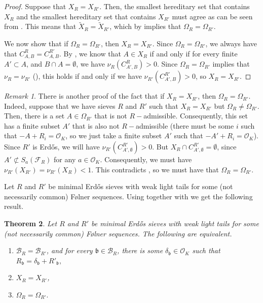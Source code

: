 \documentclass[a4paper,11pt,reqno]{amsart}
\theoremstyle{plain}
\newtheorem{theorem}{Theorem}[section]
\theoremstyle{remark}
\newtheorem{remark}[theorem]{Remark}
\newcommand{\cb}{\mathcal{B}}
\newcommand{\co}{\mathcal{O}}
\newcommand{\fr}{\mathcal{F}_R}
\newcommand{\gb}{\mathfrak{b}}
\begin{document}
			\begin{proof}
				Suppose that $X_R = X_{R'}$.	Then, the smallest hereditary set that contains $X_R$ and the smallest hereditary set that contains $X_{R'}$  must agree as can be seen from . This means that $\widetilde{X}_R = \widetilde{X}_{R'}$, which by   implies that $\Omega_R =\Omega_{R'}$.
				
				
				We now show that if $\Omega_R =\Omega_{R'}$, then $X_R = X_{R'}$. Since $\Omega_R =\Omega_{R'}$, we always have that $C^R_{A,B} = C^{R'}_{A,B}$. By  , we know that $A \in X_R$ if and only if for every finite $A' \subset A$, and $B \cap A = \emptyset$, we have $\nu_R(C^R_{A',B}) >0$. Since $\Omega_R =\Omega_{R'}$ implies that $\nu_R = \nu_{R'}$ (), this holds if and only if we have $\nu_{R'}(C^{R'}_{A',B}) >0$, so $X_R=X_{R'}$.
				
				
			\end{proof}
			
		
			
			\begin{remark}
				There is another proof of the fact that if $X_R = X_{R'}$, then $\Omega_{R} = \Omega_{R'}$. Indeed, suppose that we have sieves $R$ and $R'$ such that $X_R = X_{R'}$ but $\Omega_{R} \neq \Omega_{R'}$. Then, there is a set $A \in\Omega_{R'} $ that is not $R-$admissible. Consequently, this set has a finite subset $A'$ that is also not $R-$admissible (there must be some $i$ such that $-A+R_i = \co_{K}$, so we just take a finite subset $A'$ such that $-A'+R_i = \co_{K}$). Since $R'$ is Erdős, we will have $\nu_{R'}(C^{R'}_{A',\emptyset}) >0$. But $X_R \cap C^{R'}_{A',\emptyset} = \emptyset$, since $A' \not \subset S_a(\fr)$ for any $a \in\co_K$. Consequently, we must have $\nu_{R'}(X_{R'}) = \nu_{R'}(X_{R}) < 1$. This contradicts  , so we must have that $\Omega_{R} = \Omega_{R'}$.
			\end{remark}
			
			Let $R$ and $R'$ be minimal Erdős sieves with weak light tails for some (not necessarily common) Følner sequences. Using   together with    we get the following result.
			
			
			\begin{theorem}
				\label{thm: equivalence XR =XRp and OmegaR = OmegaRp}
				Let $R$ and $R'$ be minimal Erdős sieves with weak light tails for some (not necessarily common) Følner sequences. The following are equivalent. 
				
				\begin{enumerate}
					\item $\cb_R = \cb_{R'}$, and for every $\gb \in \cb_R$, there is some $\delta_\gb\in \co_K$ such that $R_\gb = \delta_\gb+ R'_\gb,$ 
					\item $X_R = X_{R'}$,
					\item $\Omega_{R} = \Omega_{R'}.$
				\end{enumerate} 
			\end{theorem}
			
\end{document}

